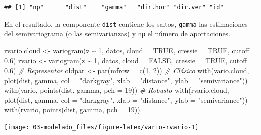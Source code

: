 \documentclass[
  spanish,
]{book}
\newenvironment{Shaded}{\begin{snugshade}}{\end{snugshade}}
\newcommand{\AttributeTok}[1]{\textcolor[rgb]{0.77,0.63,0.00}{#1}}
\newcommand{\CommentTok}[1]{\textcolor[rgb]{0.56,0.35,0.01}{\textit{#1}}}
\newcommand{\ConstantTok}[1]{\textcolor[rgb]{0.00,0.00,0.00}{#1}}
\newcommand{\DecValTok}[1]{\textcolor[rgb]{0.00,0.00,0.81}{#1}}
\newcommand{\FloatTok}[1]{\textcolor[rgb]{0.00,0.00,0.81}{#1}}
\newcommand{\FunctionTok}[1]{\textcolor[rgb]{0.00,0.00,0.00}{#1}}
\newcommand{\NormalTok}[1]{#1}
\newcommand{\OtherTok}[1]{\textcolor[rgb]{0.56,0.35,0.01}{#1}}
\newcommand{\SpecialCharTok}[1]{\textcolor[rgb]{0.00,0.00,0.00}{#1}}
\newcommand{\StringTok}[1]{\textcolor[rgb]{0.31,0.60,0.02}{#1}}
\theoremstyle{break}
\theoremstyle{definition}
\theoremstyle{definition}
\theoremstyle{definition}
\theoremstyle{definition}
\theoremstyle{remark}
\begin{document}
\begin{verbatim}
## [1] "np"      "dist"    "gamma"   "dir.hor" "dir.ver" "id"
\end{verbatim}

En el resultado, la componente \texttt{dist} contiene los saltos, \texttt{gamma} las estimaciones del semivariograma (o las semivarianzas) y \texttt{np} el número de aportaciones.

\begin{Shaded}
\begin{Highlighting}[]
\NormalTok{rvario.cloud }\OtherTok{\textless{}{-}} \FunctionTok{variogram}\NormalTok{(z }\SpecialCharTok{\textasciitilde{}} \DecValTok{1}\NormalTok{, datos, }\AttributeTok{cloud =} \ConstantTok{TRUE}\NormalTok{, }\AttributeTok{cressie =} \ConstantTok{TRUE}\NormalTok{, }\AttributeTok{cutoff =} \FloatTok{0.6}\NormalTok{)}
\NormalTok{rvario }\OtherTok{\textless{}{-}} \FunctionTok{variogram}\NormalTok{(z }\SpecialCharTok{\textasciitilde{}} \DecValTok{1}\NormalTok{, datos, }\AttributeTok{cloud =} \ConstantTok{FALSE}\NormalTok{, }\AttributeTok{cressie =} \ConstantTok{TRUE}\NormalTok{, }\AttributeTok{cutoff =} \FloatTok{0.6}\NormalTok{)}
\CommentTok{\# Representar}
\NormalTok{oldpar }\OtherTok{\textless{}{-}} \FunctionTok{par}\NormalTok{(}\AttributeTok{mfrow =} \FunctionTok{c}\NormalTok{(}\DecValTok{1}\NormalTok{, }\DecValTok{2}\NormalTok{))}
\CommentTok{\# Clásico}
\FunctionTok{with}\NormalTok{(vario.cloud,  }\FunctionTok{plot}\NormalTok{(dist, gamma, }\AttributeTok{col =} \StringTok{"darkgray"}\NormalTok{, }
                        \AttributeTok{xlab =} \StringTok{"distance"}\NormalTok{, }\AttributeTok{ylab =}  \StringTok{"semivariance"}\NormalTok{))}
\FunctionTok{with}\NormalTok{(vario, }\FunctionTok{points}\NormalTok{(dist, gamma, }\AttributeTok{pch =} \DecValTok{19}\NormalTok{))}
\CommentTok{\# Robusto}
\FunctionTok{with}\NormalTok{(rvario.cloud,  }\FunctionTok{plot}\NormalTok{(dist, gamma, }\AttributeTok{col =} \StringTok{"darkgray"}\NormalTok{, }
                        \AttributeTok{xlab =} \StringTok{"distance"}\NormalTok{, }\AttributeTok{ylab =}  \StringTok{"semivariance"}\NormalTok{))}
\FunctionTok{with}\NormalTok{(rvario, }\FunctionTok{points}\NormalTok{(dist, gamma, }\AttributeTok{pch =} \DecValTok{19}\NormalTok{))}
\end{Highlighting}
\end{Shaded}

\begin{center}\texttt{[image: 03-modelado\_files/figure-latex/vario-rvario-1]} \end{center}
\end{document}
